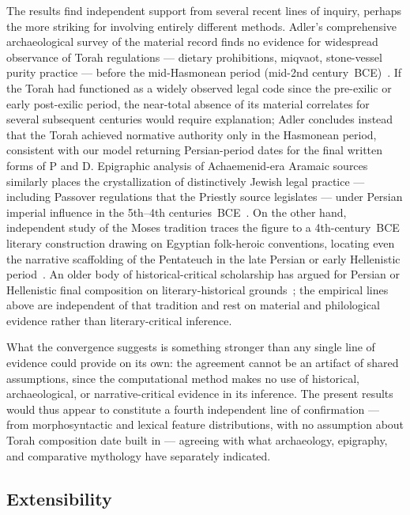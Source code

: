 \documentclass[10pt,letterpaper]{article}
\begin{document}
The results find independent support from several recent lines of
inquiry, perhaps the more striking for involving entirely different
methods.  Adler's comprehensive archaeological survey of the material
record finds no evidence for widespread observance of Torah regulations
--- dietary prohibitions, miqvaot, stone-vessel purity practice ---
before the mid-Hasmonean period (mid-2nd century~BCE)~\cite{Adler2022}.
If the Torah had functioned as a widely observed legal code since the
pre-exilic or early post-exilic period, the near-total absence of its
material correlates for several subsequent centuries would require
explanation; Adler concludes instead that the Torah achieved normative
authority only in the Hasmonean period, consistent with our model
returning Persian-period dates for the final written forms of P and D.
Epigraphic analysis of Achaemenid-era Aramaic sources similarly places
the crystallization of distinctively Jewish legal practice --- including
Passover regulations that the Priestly source legislates --- under
Persian imperial influence in the 5th--4th centuries~BCE~\cite{Barnea2026}.
On the other hand, independent study of the Moses tradition traces the
figure to a 4th-century~BCE literary construction drawing on Egyptian
folk-heroic conventions, locating even the narrative scaffolding of the
Pentateuch in the late Persian or early Hellenistic
period~\cite{Adair2025}.  An older body of historical-critical scholarship
has argued for Persian or Hellenistic final composition on
literary-historical grounds~\cite{Thompson1999,Lemche2008,Davies1992};
the empirical lines above are independent of that tradition and rest on
material and philological evidence rather than literary-critical
inference.

What the convergence suggests is something stronger than any single line
of evidence could provide on its own: the agreement cannot be an artifact
of shared assumptions, since the computational method makes no use of
historical, archaeological, or narrative-critical evidence in its
inference.  The present results would thus appear to constitute a fourth
independent line of confirmation --- from morphosyntactic and lexical
feature distributions, with no assumption about Torah composition date
built in --- agreeing with what archaeology, epigraphy, and comparative
mythology have separately indicated.

\subsection*{Extensibility}
\end{document}
